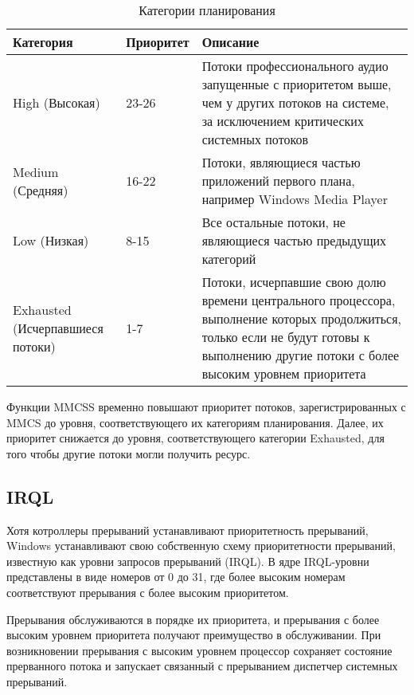 \begin{table}[ht!]
	\caption{Категории планирования}
	\begin{center}
		\begin{tabular}{|p{}|p{}|p{}|}
			\hline
			Категория & Приоритет & Описание \\ \hline
			High (Высокая)  & 23-26 & Потоки профессионального аудио запущенные с приоритетом выше, чем у других потоков на системе, за исключением критических системных потоков \\ \hline
			Medium (Средняя) & 16-22 & Потоки, являющиеся частью приложений первого плана, например Windows Media Player \\ \hline
			Low (Низкая) & 8-15 & Все остальные потоки, не являющиеся частью предыдущих категорий \\  \hline
			Exhausted (Исчерпавшиеся потоки) & 1-7 & Потоки, исчерпавшие свою долю времени центрального процессора, выполнение которых продолжиться, только если не будут готовы к выполнению другие потоки с более высоким уровнем приоритета \\ \hline
		\end{tabular}
	\end{center}
\end{table}

\FloatBarrier

Функции MMCSS временно повышают приоритет потоков, зарегистрированных с MMCS до уровня, соответствующего их категориям планирования. Далее, их приоритет снижается до уровня, соответствующего категории Exhausted, для того чтобы другие потоки могли получить ресурс.

\subsection{IRQL}

Хотя котроллеры прерываний устанавливают приоритетность прерываний, Windows устанавливают свою собственную схему приоритетности прерываний, известную как уровни запросов прерываний (IRQL). В ядре IRQL-уровни представлены в виде номеров от 0 до 31, где более высоким номерам соответствуют прерывания с более высоким приоритетом.


\FloatBarrier

Прерывания обслуживаются в порядке их приоритета, и прерывания с более высоким уровнем приоритета получают преимущество в обслуживании. При возникновении прерывания с высоким уровнем процессор сохраняет состояние прерванного потока и запускает связанный с прерыванием диспетчер системных прерываний.

